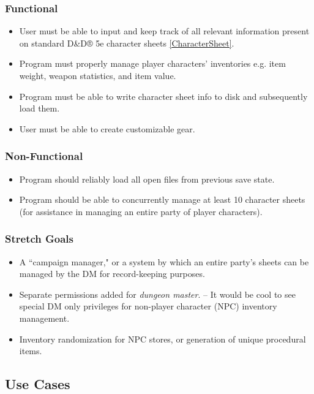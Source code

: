 \documentclass[10pt,conference,onecolumn,compsoc]{IEEEtran}
\begin{document}
\subsubsection{Functional}
\begin{itemize}
\item User must be able to input and keep track of all relevant information present on standard D\&D® 5e character sheets \ref{CharacterSheet}.
\item Program must properly manage player characters' inventories e.g. item weight, weapon statistics, and item value.
\item Program must be able to write character sheet info to disk and subsequently load them.
\item User must be able to create customizable gear.
\end{itemize}

\subsubsection{Non-Functional}
\begin{itemize}
\item Program should reliably load all open files from previous save state.
\item Program should be able to concurrently manage at least 10 character sheets (for assistance in managing an entire party of player characters).

\end{itemize}

\subsubsection{Stretch Goals}
\begin{itemize}
\item A ``campaign manager," or a system by which an entire party's sheets can be managed by the DM for record-keeping purposes.
\item Separate permissions added for \textit{dungeon master}. -- It would be cool to see special DM only privileges for non-player character (NPC) inventory management.
\item Inventory randomization for NPC stores, or generation of unique procedural items.

\end{itemize}

\subsection{Use Cases}
\end{document}
